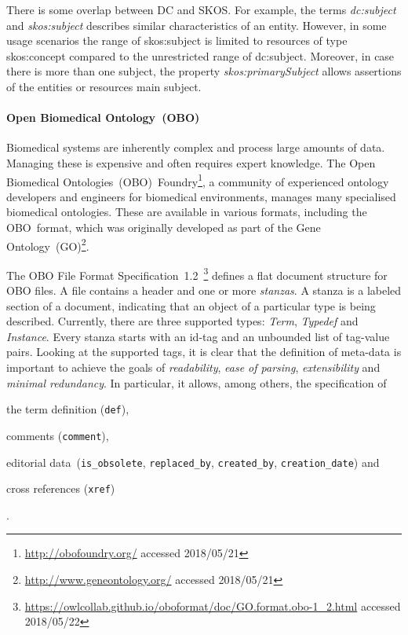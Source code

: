 \documentclass[draft,final]{vutinfth} %
\begin{document}
There is some overlap between DC and SKOS. For example, the terms \textit{dc:subject} and \textit{skos:subject} describes similar characteristics of an entity. However, in some usage scenarios the range of skos:subject is limited to resources of type skos:concept compared to the unrestricted range of dc:subject. Moreover, in case there is more than one subject, the property \textit{skos:primarySubject} allows assertions of the entities or resources main subject. 

\paragraph{Open Biomedical Ontology~(OBO)} Biomedical systems are inherently complex and process large amounts of data. Managing these is
expensive and often requires expert knowledge. The Open Biomedical Ontologies~(OBO)~Foundry\footnote{\url{http://obofoundry.org/} accessed 2018/05/21}, a community of experienced ontology developers and engineers for biomedical environments, manages many specialised biomedical ontologies. These are available in various formats, including the OBO~format, which was originally developed as part of the Gene Ontology~(GO)\footnote{\url{http://www.geneontology.org/} accessed 2018/05/21}. 

The OBO File Format Specification~1.2~\footnote{\url{https://owlcollab.github.io/oboformat/doc/GO.format.obo-1_2.html} accessed 2018/05/22} defines a flat document structure for OBO files. A file contains a header and one or more \emph{stanzas}. A stanza is a labeled section of a document, indicating that an object of a particular type is being described. Currently, there are three supported types: \textit{Term}, \textit{Typedef} and \textit{Instance}. Every stanza starts with an id-tag and an unbounded list of tag-value pairs. Looking at the supported tags, it is clear that the definition of meta-data is important to achieve the goals of \textit{readability}, \textit{ease of parsing}, \textit{extensibility} and \textit{minimal redundancy}. In particular, it allows, among others, the specification of 
\begin{inparaenum}[1)]
		\item the term definition (\texttt{def}),
		\item comments (\texttt{comment}),
		\item editorial data~(\texttt{is\_obsolete}, \texttt{replaced\_by}, \texttt{created\_by}, \texttt{creation\_date}) and
		\item cross references (\texttt{xref})
\end{inparaenum}.
\end{document}
